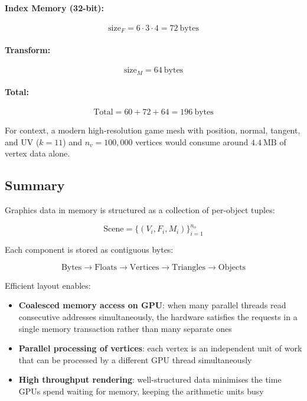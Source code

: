 \documentclass[11pt]{article}
\begin{document}
\paragraph{Index Memory (32-bit):}

\begin{equation}
    \text{size}_F = 6 \cdot 3 \cdot 4 = 72\ \text{bytes}
\end{equation}

\paragraph{Transform:}

\begin{equation}
    \text{size}_M = 64\ \text{bytes}
\end{equation}

\paragraph{Total:}

\begin{equation}
    \text{Total} = 60 + 72 + 64 = 196\ \text{bytes}
\end{equation}

For context, a modern high-resolution game mesh with position, normal, tangent, and UV ($k = 11$) and $n_v = 100{,}000$ vertices would consume around $4.4\ \text{MB}$ of vertex data alone.

\subsection{Summary}

Graphics data in memory is structured as a collection of per-object tuples:

\begin{equation}
    \text{Scene} =
    \{(V_i, F_i, M_i)\}_{i=1}^{n_o}
\end{equation}

Each component is stored as contiguous bytes:

\begin{equation}
    \text{Bytes} \rightarrow \text{Floats} \rightarrow \text{Vertices} \rightarrow \text{Triangles} \rightarrow \text{Objects}
\end{equation}

Efficient layout enables:

\begin{itemize}
    \item \textbf{Coalesced memory access on GPU}: when many parallel threads read consecutive addresses simultaneously, the hardware satisfies the requests in a single memory transaction rather than many separate ones
    \item \textbf{Parallel processing of vertices}: each vertex is an independent unit of work that can be processed by a different GPU thread simultaneously
    \item \textbf{High throughput rendering}: well-structured data minimises the time GPUs spend waiting for memory, keeping the arithmetic units busy
\end{itemize}
\end{document}
